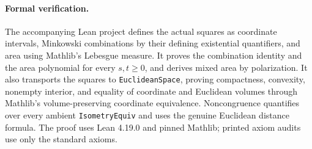 \documentclass[11pt]{article}
\begin{document}
\paragraph{Formal verification.}
The accompanying Lean project defines the actual squares as coordinate intervals, Minkowski combinations by their defining existential quantifiers, and area using Mathlib's Lebesgue measure. It proves the combination identity and the area polynomial for every $s,t\geq0$, and derives mixed area by polarization. It also transports the squares to \texttt{EuclideanSpace}, proving compactness, convexity, nonempty interior, and equality of coordinate and Euclidean volumes through Mathlib's volume-preserving coordinate equivalence. Noncongruence quantifies over every ambient \texttt{IsometryEquiv} and uses the genuine Euclidean distance formula. The proof uses Lean 4.19.0 and pinned Mathlib; printed axiom audits use only the standard axioms.
\end{document}
